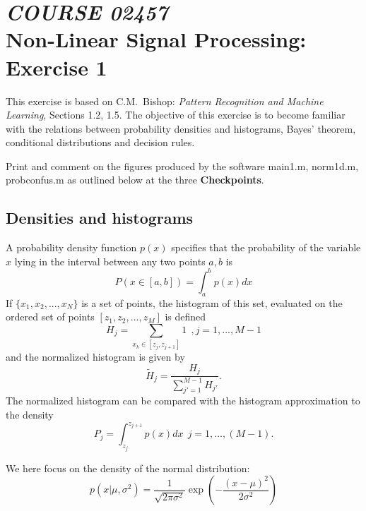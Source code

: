 \textwidth 16cm
\textheight 22cm
\oddsidemargin 0cm
\topmargin -1cm
\def\x{{\bf x}}
\def\w{{\bf w}}
\def\squeeze{\itemsep=0pt\parskip=0pt}



\section*{{\it COURSE 02457}\\[5mm] Non-Linear Signal Processing: Exercise 1}

This exercise is based on C.M.\ Bishop: {\it Pattern Recognition
and Machine Learning}, Sections 1.2, 1.5. The objective of this
exercise is to become familiar with the relations between
probability densities and histograms, Bayes' theorem, conditional
distributions and decision rules.

Print and comment on the figures produced by the software {\sf main1.m, norm1d.m, probconfus.m}
as outlined below at the three {\bf Checkpoints}.


\subsection*{Densities and histograms}
A probability density function $p(x)$ specifies that the probability of the
variable $x$ lying in the interval between any two points $a,b$ is
\begin{equation}
P(x \in [a,b]) = \int_{a}^{b} p(x) dx
\end{equation}
If $\{x_1,x_2,...,x_N\}$ is a set of points, the histogram of this set,
 evaluated on the ordered set of points $[z_1,z_2,...,z_M]$ is defined
 \begin{equation}
H_j =  \sum_{x_{k}  \in [z_{j},z_{j+1}]} 1 \ \ ,j=1,...,M-1
\end{equation}
and the normalized histogram is given by
\begin{equation}
\tilde{H}_j = \frac{H_j}{\sum_{j'=1}^{M-1} H_{j'}}.
\end{equation}
The normalized histogram can be compared with the histogram approximation
to the density
\begin{equation}
P_j =  \int_{z_{j}}^{z_{j+1}} p(x) dx \ \ j=1,...,(M-1).
\end{equation}



We here focus on the density of the normal distribution:
\begin{equation}
p(x|\mu, \sigma^2) = \frac{1}{\sqrt{2\pi \sigma^2}}\exp \left( -\frac{(x-\mu)^2}{2\sigma^2}\right)
\end{equation}

